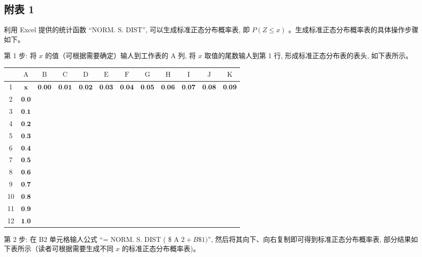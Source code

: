 \documentclass[10pt]{article}
\begin{document}
\begin{CJK*}{UTF8}{bsmi}
\section*{附表 1}
\begin{center}
\end{center}

利用 Excel 提供的统计函数 “NORM. S. DIST”, 可以生成标准正态分布概率表, 即 $P(Z \leqslant x)$ 。生成标准正态分布概率表的具体操作步骤如下。

第 1 步: 将 $x$ 的值（可根据需要确定）输人到工作表的 A 列, 将 $x$ 取值的尾数输人到第 1 行, 形成标准正态分布表的表头, 如下表所示。

\begin{center}
\begin{tabular}{|c|c|c|c|c|c|c|c|c|c|c|c|}
 & $\mathrm{A}$ & $\mathrm{B}$ & $\mathrm{C}$ & $\mathrm{D}$ & $\mathrm{E}$ & $\mathrm{F}$ & $\mathrm{G}$ & $\mathrm{H}$ & $\mathrm{I}$ & $\mathrm{J}$ & $\mathrm{K}$ \\
\hline
1 & $\boldsymbol{x}$ & $\mathbf{0 . 0 0}$ & $\mathbf{0 . 0 1}$ & $\mathbf{0 . 0 2}$ & $\mathbf{0 . 0 3}$ & $\mathbf{0 . 0 4}$ & $\mathbf{0 . 0 5}$ & $\mathbf{0 . 0 6}$ & $\mathbf{0 . 0 7}$ & $\mathbf{0 . 0 8}$ & $\mathbf{0 . 0 9}$ \\
\hline
2 & $\mathbf{0 . 0}$ &  &  &  &  &  &  &  &  &  &  \\
\hline
3 & $\mathbf{0 . 1}$ &  &  &  &  &  &  &  &  &  &  \\
\hline
4 & $\mathbf{0 . 2}$ &  &  &  &  &  &  &  &  &  &  \\
\hline
5 & $\mathbf{0 . 3}$ &  &  &  &  &  &  &  &  &  &  \\
\hline
6 & $\mathbf{0 . 4}$ &  &  &  &  &  &  &  &  &  &  \\
\hline
7 & $\mathbf{0 . 5}$ &  &  &  &  &  &  &  &  &  &  \\
\hline
8 & $\mathbf{0 . 6}$ &  &  &  &  &  &  &  &  &  &  \\
\hline
9 & $\mathbf{0 . 7}$ &  &  &  &  &  &  &  &  &  &  \\
\hline
10 & $\mathbf{0 . 8}$ &  &  &  &  &  &  &  &  &  &  \\
\hline
11 & $\mathbf{0 . 9}$ &  &  &  &  &  &  &  &  &  &  \\
\hline
12 & $\mathbf{1 . 0}$ &  &  &  &  &  &  &  &  &  &  \\
\hline
\end{tabular}
\end{center}

第 2 步: 在 B2 单元格输人公式 “= NORM. S. DIST ( \$ A $2+B \$ 1) ”$, 然后将其向下、向右复制即可得到标准正态分布概率表, 部分结果如下表所示（读者可根据需要生成不同 $x$ 的标准正态分布概率表)。


\end{CJK*}
\end{document}
